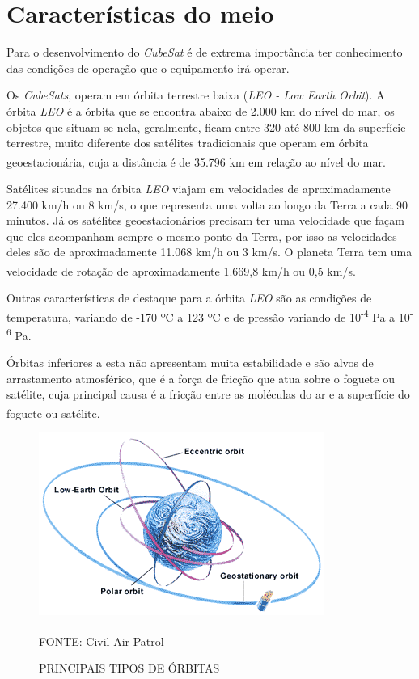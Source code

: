 \documentclass[
	12pt,				%
	openright,			%
	oneside,			%
	a4paper,			%
	english,			%
	french,				%
	spanish,			%
	brazil,				%
	oldfontcommands
	]{abntex2}
\begin{document}
\section[Características do meio]{Características do meio}
	
	Para o desenvolvimento do \textit{CubeSat} é de extrema importância ter conhecimento das condições de operação que o equipamento irá operar.
	
	Os \textit{CubeSats}, operam em órbita terrestre baixa (\textit{LEO - Low Earth Orbit}). A órbita \textit{LEO} é a órbita que se encontra abaixo de 2.000 km do nível do mar, os objetos que situam-se nela, geralmente, ficam entre 320 até 800 km da superfície terrestre, muito diferente dos satélites tradicionais que operam em órbita geoestacionária, cuja a distância é de 35.796 km em relação ao nível do mar.\textsuperscript{\cite{LEO}}\textsuperscript{\cite{GEO}}
	
	Satélites situados na órbita \textit{LEO} viajam em velocidades de aproximadamente 27.400 km/h ou 8 km/s, o que representa uma volta ao longo da Terra a cada 90 minutos. Já os satélites geoestacionários precisam ter uma velocidade que façam que eles acompanham sempre o mesmo ponto da Terra, por isso as velocidades deles são de aproximadamente 11.068 km/h ou 3 km/s. O planeta Terra tem uma velocidade de rotação de aproximadamente 1.669,8 km/h ou 0,5 km/s.\textsuperscript{\cite{LEO}}\textsuperscript{\cite{GEO}}
	
	Outras características de destaque para a órbita \textit{LEO} são as condições de temperatura, variando de -170 ºC a 123 ºC e de pressão variando de 10\textsuperscript{-4} Pa a 10\textsuperscript{-6} Pa.\textsuperscript{\cite{LEO}}
	
	Órbitas inferiores a esta não apresentam muita estabilidade e são alvos de arrastamento atmosférico, que é a força de fricção que atua sobre o foguete ou satélite, cuja principal causa é a fricção entre as moléculas do ar e a superfície do foguete ou satélite.\textsuperscript{\cite{NASA2}}
	
	\begin{figure}[th]
		\caption{PRINCIPAIS TIPOS DE ÓRBITAS}
		\label{Fig_Orbitas}
		\centering
		\includegraphics[width=0.65\linewidth]{./figs/cubesat_03}
			
		\begin{small}
			FONTE: Civil Air Patrol\textsuperscript{\cite{CAP}}
		\end{small}		
	\end{figure}
	
\end{document}
